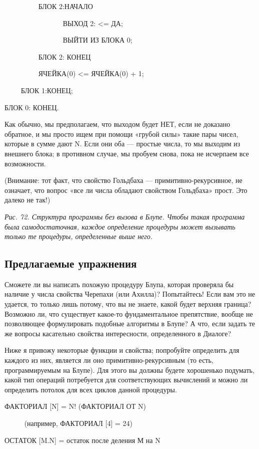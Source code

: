 \documentclass[../main.tex]{subfiles}
\begin{document}
~~~~~~~~~ БЛОК 2:НАЧАЛО

~~~~~~~~~~~~~~~~ ВЫХОД 2: \textless= ДА;

~~~~~~~~~~~~~~~~ ВЫЙТИ ИЗ БЛОКА 0;

~~~~~~~~~ БЛОК 2: КОНЕЦ

~~~~~~~~~ ЯЧЕЙКА(0) \textless= ЯЧЕЙКА(0) + 1;

~~~~ БЛОК 1:КОНЕЦ;

БЛОК 0: КОНЕЦ.

Как обычно, мы предполагаем, что выходом будет НЕТ, если не доказано обратное, и мы просто ищем при помощи «грубой силы» такие пары чисел, которые в сумме дают N\@. Если они оба --- простые числа, то мы выходим из внешнего блока; в противном случае, мы пробуем снова, пока не исчерпаем все возможности.

(Внимание: тот факт, что свойство Гольдбаха --- примитивно-рекурсивное, не означает, что вопрос «все ли числа обладают свойством Гольдбаха» прост. Это далеко не так!)

\emph{Рис. 72. Структура программы без вызова в Блупе. Чтобы такая программа была самодостаточная, каждое определение процедуры может вызывать только те процедуры, определенные выше него.}


\subsection{Предлагаемые упражнения}

Сможете ли вы написать похожую процедуру Блупа, которая проверяла бы наличие у числа свойства Черепахи (или Ахилла)? Попытайтесь! Если вам это не удается, то только лишь потому, что вы не знаете, какой будет верхняя граница? Возможно ли, что существует какое-то фундаментальное препятствие, вообще не позволяющее формулировать подобные алгоритмы в Блупе? А что, если задать те же вопросы касательно свойства интересности, определенного в Диалоге?

Ниже я привожу некоторые функции и свойства; попробуйте определить для каждого из них, является ли оно примитивно-рекурсивным (то есть, программируемым на Блупе). Для этого вы должны будете хорошенько подумать, какой тип операций потребуется для соответствующих вычислений и можно ли определить потолок для всех циклов данной процедуры.

ФАКТОРИАЛ {[}N{]} = N! (ФАКТОРИАЛ ОТ N)

~~~~~ (например, ФАКТОРИАЛ {[}4{]} = 24)

ОСТАТОК {[}M.N{]} = остаток после деления М на N
\end{document}

